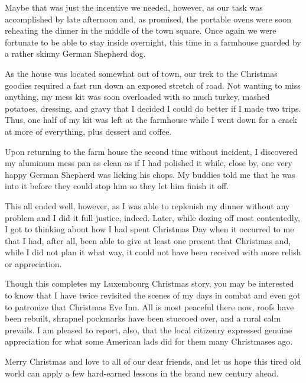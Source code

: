 \documentclass[../m3y]{subfiles}
\begin{document}
Maybe that was just the incentive we needed, however, as our task was accomplished by late afternoon and, as promised, the portable ovens were soon reheating the dinner in the middle of the town square. Once again we were fortunate to be able to stay inside overnight, this time in a farmhouse guarded by a rather skinny German Shepherd dog.

As the house was located somewhat out of town, our trek to the Christmas goodies required a fast run down an exposed stretch of road. Not wanting to miss anything, my mess kit was soon overloaded with so much turkey, mashed potatoes, dressing, and gravy that I decided I could do better if I made two trips. Thus, one half of my kit was left at the farmhouse while I went down for a crack at more of everything, plus dessert and coffee.

Upon returning to the farm house the second time without incident, I discovered my aluminum mess pan as clean as if I had polished it while, close by, one very happy German Shepherd was licking his chops. My buddies told me that he was into it before they could stop him so they let him finish it off.

This all ended well, however, as I was able to replenish my dinner without any problem and I did it full justice, indeed. Later, while dozing off most contentedly, I got to thinking about how I had spent Christmas Day when it occurred to me that I had, after all, been able to give at least one present that Christmas and, while I did not plan it what way, it could not have been received with more relish or appreciation.

Though this completes my Luxembourg Christmas story, you may be interested to know that I have twice revisited the scenes of my days in combat and even got to patronize that Christmas Eve Inn. All is most peaceful there now, roofs have been rebuilt, shrapnel pockmarks have been stuccoed over, and a rural calm prevails. I am pleased to report, also, that the local citizenry expressed genuine appreciation for what some American lads did for them many Christmases ago.

Merry Christmas and love to all of our dear friends, and let us hope this tired old world can apply a few hard-earned lessons in the brand new century ahead.
\end{document}
